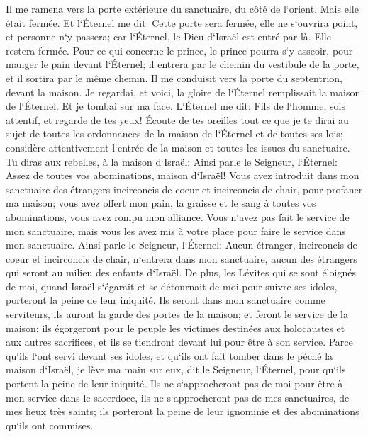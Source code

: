 \verse Il me ramena vers la porte extérieure du sanctuaire, du côté de l`orient. Mais elle était fermée. 
\verse Et l`Éternel me dit: Cette porte sera fermée, elle ne s`ouvrira point, et personne n`y passera; car l`Éternel, le Dieu d`Israël est entré par là. Elle restera fermée. 
\verse Pour ce qui concerne le prince, le prince pourra s`y asseoir, pour manger le pain devant l`Éternel; il entrera par le chemin du vestibule de la porte, et il sortira par le même chemin. 
\verse Il me conduisit vers la porte du septentrion, devant la maison. Je regardai, et voici, la gloire de l`Éternel remplissait la maison de l`Éternel. Et je tombai sur ma face. 
\verse L`Éternel me dit: Fils de l`homme, sois attentif, et regarde de tes yeux! Écoute de tes oreilles tout ce que je te dirai au sujet de toutes les ordonnances de la maison de l`Éternel et de toutes ses lois; considère attentivement l`entrée de la maison et toutes les issues du sanctuaire. 
\verse Tu diras aux rebelles, à la maison d`Israël: Ainsi parle le Seigneur, l`Éternel: Assez de toutes vos abominations, maison d`Israël! 
\verse Vous avez introduit dans mon sanctuaire des étrangers incirconcis de coeur et incirconcis de chair, pour profaner ma maison; vous avez offert mon pain, la graisse et le sang à toutes vos abominations, vous avez rompu mon alliance. 
\verse Vous n`avez pas fait le service de mon sanctuaire, mais vous les avez mis à votre place pour faire le service dans mon sanctuaire. 
\verse Ainsi parle le Seigneur, l`Éternel: Aucun étranger, incirconcis de coeur et incirconcis de chair, n`entrera dans mon sanctuaire, aucun des étrangers qui seront au milieu des enfants d`Israël. 
\verse De plus, les Lévites qui se sont éloignés de moi, quand Israël s`égarait et se détournait de moi pour suivre ses idoles, porteront la peine de leur iniquité. 
\verse Ils seront dans mon sanctuaire comme serviteurs, ils auront la garde des portes de la maison; et feront le service de la maison; ils égorgeront pour le peuple les victimes destinées aux holocaustes et aux autres sacrifices, et ils se tiendront devant lui pour être à son service. 
\verse Parce qu`ils l`ont servi devant ses idoles, et qu`ils ont fait tomber dans le péché la maison d`Israël, je lève ma main sur eux, dit le Seigneur, l`Éternel, pour qu`ils portent la peine de leur iniquité. 
\verse Ils ne s`approcheront pas de moi pour être à mon service dans le sacerdoce, ils ne s`approcheront pas de mes sanctuaires, de mes lieux très saints; ils porteront la peine de leur ignominie et des abominations qu`ils ont commises. 
